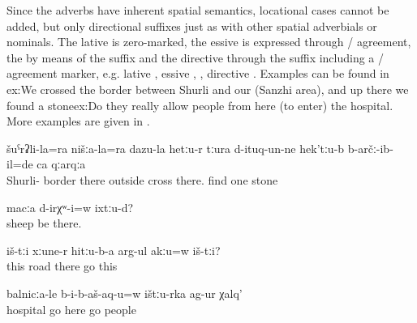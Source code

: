 Since the adverbs have inherent spatial semantics, locational cases cannot be added, but only directional suffixes just as with other spatial adverbials or nominals. The lative is zero-marked, the essive is expressed through / agreement, the  by means of the suffix  and the directive through the suffix  including a / agreement marker, e.g. lative , essive ,  , directive . Examples can be found in {ex:We crossed the border between Shurli and our (Sanzhi area), and up there we found a stone}{ex:Do they really allow people from here (to enter) the hospital}. More examples are given in .
%
\begin{exe}
	\ex	\label{ex:We crossed the border between Shurli and our (Sanzhi area), and up there we found a stone}
	\gll	šuˁrʡli-la=ra	nišːa-la=ra	dazu-la	hetːu-r	tːura	d-ituq-un-ne	hek'tːu-b	b-arčː-ib-il=de	ca	qːarqːa\\
		Shurli-		border	there	outside	cross	there.	find	one	stone\\
	\glt	{}

	\ex	\label{ex:Were there sheep up there}
	\gll	macːa	d-irχʷ-i=w	ixtːu-d?\\
		sheep	be	there.\\
	\glt	{}

	\ex	\label{ex:They are walking on (along) the road there, right, these}
	\gll	iš-tːi	xːune-r	hitːu-b-a	arg-ul akːu=w	iš-tːi?\\
		this	road	there	go 	this\\
	\glt	{}

	\ex	\label{ex:Do they really allow people from here (to enter) the hospital}
	\gll	balnicːa-le	b-i-b-aš-aq-u=w	ištːu-rka	ag-ur	χalq'\\
		hospital	go	here	go	people\\
	\glt	{}
\end{exe}

